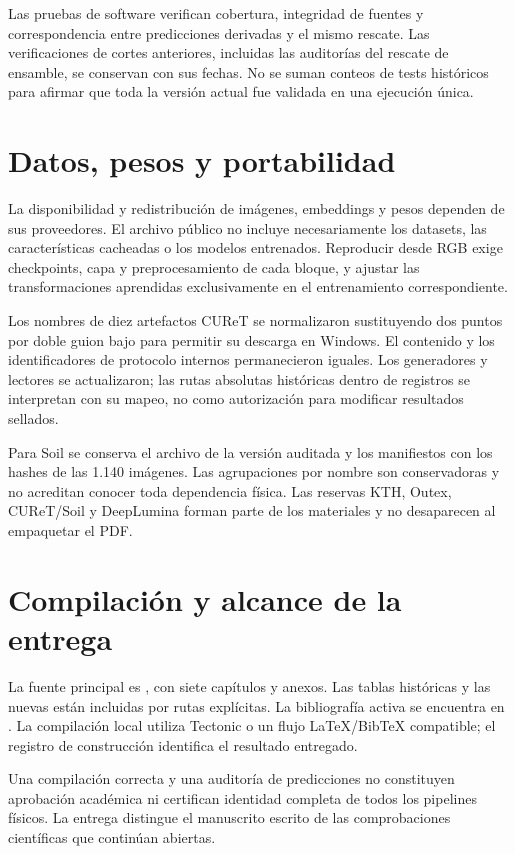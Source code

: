 Las pruebas de software verifican cobertura, integridad de fuentes y correspondencia entre predicciones derivadas y el mismo rescate. Las verificaciones de cortes anteriores, incluidas las auditorías del rescate de ensamble, se conservan con sus fechas. No se suman conteos de tests históricos para afirmar que toda la versión actual fue validada en una ejecución única.

\section{Datos, pesos y portabilidad}
La disponibilidad y redistribución de imágenes, embeddings y pesos dependen de sus proveedores. El archivo público no incluye necesariamente los datasets, las características cacheadas o los modelos entrenados. Reproducir desde RGB exige checkpoints, capa y preprocesamiento de cada bloque, y ajustar las transformaciones aprendidas exclusivamente en el entrenamiento correspondiente.

Los nombres de diez artefactos CUReT se normalizaron sustituyendo dos puntos por doble guion bajo para permitir su descarga en Windows. El contenido y los identificadores de protocolo internos permanecieron iguales. Los generadores y lectores se actualizaron; las rutas absolutas históricas dentro de registros se interpretan con su mapeo, no como autorización para modificar resultados sellados.

Para Soil se conserva el archivo de la versión auditada y los manifiestos con los hashes de las 1.140 imágenes. Las agrupaciones por nombre son conservadoras y no acreditan conocer toda dependencia física. Las reservas KTH, Outex, CUReT/Soil y DeepLumina forman parte de los materiales y no desaparecen al empaquetar el PDF.

\section{Compilación y alcance de la entrega}
La fuente principal es , con siete capítulos y anexos. Las tablas históricas y las nuevas están incluidas por rutas explícitas. La bibliografía activa se encuentra en . La compilación local utiliza Tectonic o un flujo LaTeX/BibTeX compatible; el registro de construcción identifica el resultado entregado.

Una compilación correcta y una auditoría de predicciones no constituyen aprobación académica ni certifican identidad completa de todos los pipelines físicos. La entrega distingue el manuscrito escrito de las comprobaciones científicas que continúan abiertas.
